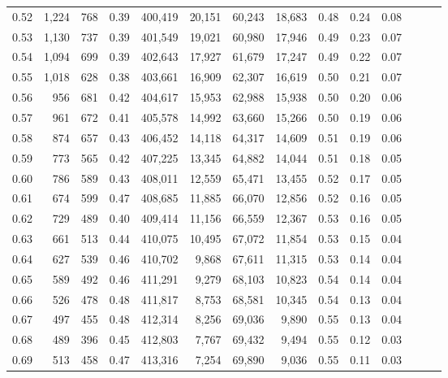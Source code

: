 \begin{tabular}{rrrrrrrrrrrrrr}
0.52 &   1,224 &    768 &  0.39 &  400,419 &   20,151 &  60,243 &  18,683 &  0.48 &  0.24 &      0.08 \\
0.53 &   1,130 &    737 &  0.39 &  401,549 &   19,021 &  60,980 &  17,946 &  0.49 &  0.23 &      0.07 \\
0.54 &   1,094 &    699 &  0.39 &  402,643 &   17,927 &  61,679 &  17,247 &  0.49 &  0.22 &      0.07 \\
0.55 &   1,018 &    628 &  0.38 &  403,661 &   16,909 &  62,307 &  16,619 &  0.50 &  0.21 &      0.07 \\
0.56 &     956 &    681 &  0.42 &  404,617 &   15,953 &  62,988 &  15,938 &  0.50 &  0.20 &      0.06 \\
0.57 &     961 &    672 &  0.41 &  405,578 &   14,992 &  63,660 &  15,266 &  0.50 &  0.19 &      0.06 \\
0.58 &     874 &    657 &  0.43 &  406,452 &   14,118 &  64,317 &  14,609 &  0.51 &  0.19 &      0.06 \\
0.59 &     773 &    565 &  0.42 &  407,225 &   13,345 &  64,882 &  14,044 &  0.51 &  0.18 &      0.05 \\
0.60 &     786 &    589 &  0.43 &  408,011 &   12,559 &  65,471 &  13,455 &  0.52 &  0.17 &      0.05 \\
0.61 &     674 &    599 &  0.47 &  408,685 &   11,885 &  66,070 &  12,856 &  0.52 &  0.16 &      0.05 \\
0.62 &     729 &    489 &  0.40 &  409,414 &   11,156 &  66,559 &  12,367 &  0.53 &  0.16 &      0.05 \\
0.63 &     661 &    513 &  0.44 &  410,075 &   10,495 &  67,072 &  11,854 &  0.53 &  0.15 &      0.04 \\
0.64 &     627 &    539 &  0.46 &  410,702 &    9,868 &  67,611 &  11,315 &  0.53 &  0.14 &      0.04 \\
0.65 &     589 &    492 &  0.46 &  411,291 &    9,279 &  68,103 &  10,823 &  0.54 &  0.14 &      0.04 \\
0.66 &     526 &    478 &  0.48 &  411,817 &    8,753 &  68,581 &  10,345 &  0.54 &  0.13 &      0.04 \\
0.67 &     497 &    455 &  0.48 &  412,314 &    8,256 &  69,036 &   9,890 &  0.55 &  0.13 &      0.04 \\
0.68 &     489 &    396 &  0.45 &  412,803 &    7,767 &  69,432 &   9,494 &  0.55 &  0.12 &      0.03 \\
0.69 &     513 &    458 &  0.47 &  413,316 &    7,254 &  69,890 &   9,036 &  0.55 &  0.11 &      0.03 \\

\end{tabular}

